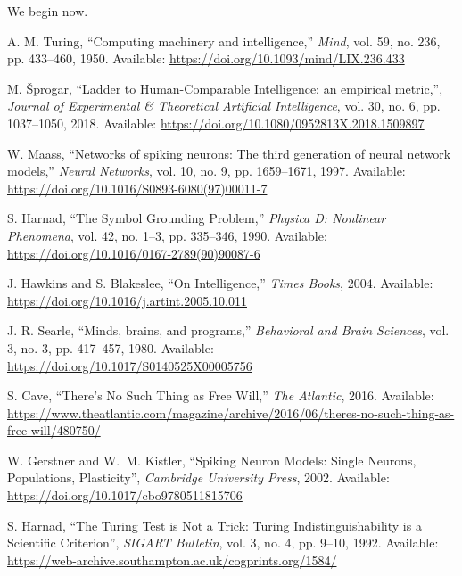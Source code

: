 \documentclass{article}
\newenvironment{ttquote}{
  \begin{minipage}[t]{0.9\linewidth}
  \ttfamily
  \setlength{\parindent}{0pt}   %
  \setlength{\parskip}{0.7em}   %
}{
  \end{minipage}
}
\begin{document}
\begin{ttquote}
We begin now.
\end{ttquote}

\newpage

\begin{thebibliography}{99}

A. M. Turing, 
``Computing machinery and intelligence,'' 
\textit{Mind}, vol. 59, no. 236, pp. 433--460, 1950. Available: \url{https://doi.org/10.1093/mind/LIX.236.433}

M. Šprogar, 
``Ladder to Human-Comparable Intelligence: an empirical metric,'', 
\textit{Journal of Experimental \& Theoretical Artificial Intelligence},
vol. 30, no. 6, pp. 1037--1050, 2018. Available: \url{https://doi.org/10.1080/0952813X.2018.1509897}

W. Maass, 
``Networks of spiking neurons: The third generation of neural network models,'' 
\textit{Neural Networks}, vol. 10, no. 9, pp. 1659--1671, 1997. Available: \url{https://doi.org/10.1016/S0893-6080(97)00011-7}

S. Harnad, 
``The Symbol Grounding Problem,'' 
\textit{Physica D: Nonlinear Phenomena}, vol. 42, no. 1--3, pp. 335--346, 1990. Available: \url{https://doi.org/10.1016/0167-2789(90)90087-6}

J. Hawkins and S. Blakeslee,
``On Intelligence,'' 
\textit{Times Books}, 2004. Available: \url{https://doi.org/10.1016/j.artint.2005.10.011}

J. R. Searle, 
``Minds, brains, and programs,'' 
\textit{Behavioral and Brain Sciences}, vol. 3, no. 3, pp. 417--457, 1980. Available: \url{https://doi.org/10.1017/S0140525X00005756}

S. Cave, 
``There’s No Such Thing as Free Will,''
\textit{The Atlantic},
2016. Available: \url{https://www.theatlantic.com/magazine/archive/2016/06/theres-no-such-thing-as-free-will/480750/}

W. Gerstner and W.~M. Kistler,
``Spiking Neuron Models: Single Neurons, Populations, Plasticity'',
\textit{Cambridge University Press}, 2002. Available:
\url{https://doi.org/10.1017/cbo9780511815706}

S. Harnad,
``The Turing Test is Not a Trick: Turing Indistinguishability is a Scientific Criterion'',
\textit{SIGART Bulletin}, vol. 3, no. 4, pp. 9--10, 1992. Available: \url{https://web-archive.southampton.ac.uk/cogprints.org/1584/}


\end{thebibliography}
\end{document}

